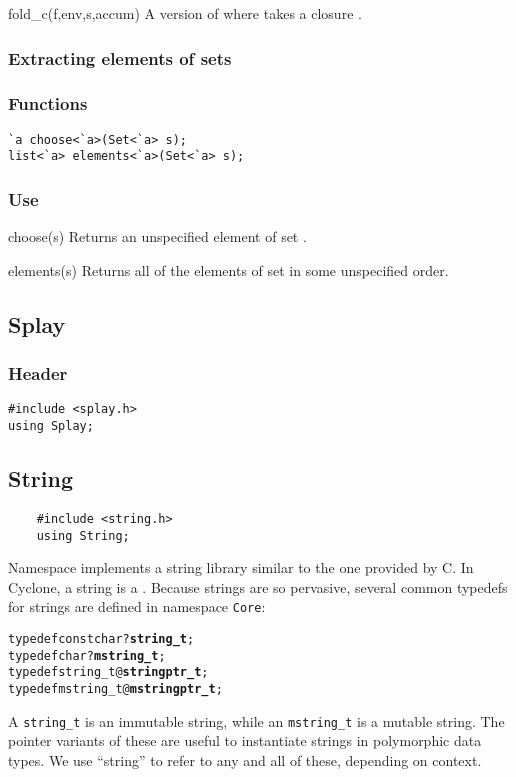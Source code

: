 \begin{defun}{fold_c}{(f,env,s,accum)}
A version of  where  takes a closure .
\end{defun}

\subsubsection*{Extracting elements of sets}
\subsubsection*{Functions}
\begin{verbatim}
`a choose<`a>(Set<`a> s);
list<`a> elements<`a>(Set<`a> s);
\end{verbatim}

\subsubsection*{Use}

\begin{defun}{choose}{(s)}
Returns an unspecified element of set .
\end{defun}

\begin{defun}{elements}{(s)}
Returns all of the elements of set  in some unspecified order.
\end{defun}

\subsection{Splay}

\subsubsection*{Header}
\begin{verbatim}
#include <splay.h>
using Splay;
\end{verbatim}

\subsection{String}

\begin{verbatim}
    #include <string.h>
    using String;
\end{verbatim}

Namespace  implements a string library similar to the one
provided by C\@.  In Cyclone, a string is a .  Because
strings are so pervasive, several common typedefs for strings are
defined in namespace \texttt{Core}:
\begin{alltt}
    typedef const char ?\textbf{string_t};
    typedef char ?\textbf{mstring_t};
    typedef string_t @\textbf{stringptr_t};
    typedef mstring_t @\textbf{mstringptr_t};
\end{alltt}
A \texttt{string_t} is an immutable string, while an
\texttt{mstring_t} is a mutable string.  The pointer variants of these
are useful to instantiate strings in polymorphic data types.  We use
``string'' to refer to any and all of these, depending on context.

